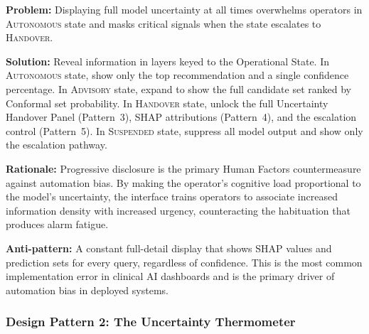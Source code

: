 \begin{tcolorbox}[patternbox,
  title={Design Pattern 1 --- Progressive Disclosure}]
\textbf{Problem:} Displaying full model uncertainty at all times
overwhelms operators in \textsc{Autonomous} state and masks
critical signals when the state escalates to
\textsc{Handover}.

\textbf{Solution:} Reveal information in layers keyed to the
Operational State.
In \textsc{Autonomous} state, show only the top recommendation
and a single confidence percentage.
In \textsc{Advisory} state, expand to show the full candidate
set ranked by Conformal set probability.
In \textsc{Handover} state, unlock the full Uncertainty Handover
Panel (Pattern~3), SHAP attributions (Pattern~4), and the
escalation control (Pattern~5).
In \textsc{Suspended} state, suppress all model output and show
only the escalation pathway.

\textbf{Rationale:} Progressive disclosure is the primary
Human Factors countermeasure against automation bias.
By making the operator's cognitive load proportional to the
model's uncertainty, the interface trains operators to associate
increased information density with increased urgency, counteracting
the habituation that produces alarm fatigue.

\textbf{Anti-pattern:} A constant full-detail display that shows
SHAP values and prediction sets for every query, regardless of
confidence.
This is the most common implementation error in clinical AI
dashboards and is the primary driver of automation bias in
deployed systems.
\end{tcolorbox}

\subsubsection{Design Pattern 2: The Uncertainty Thermometer}
\label{subsubsec:pattern-thermometer}

